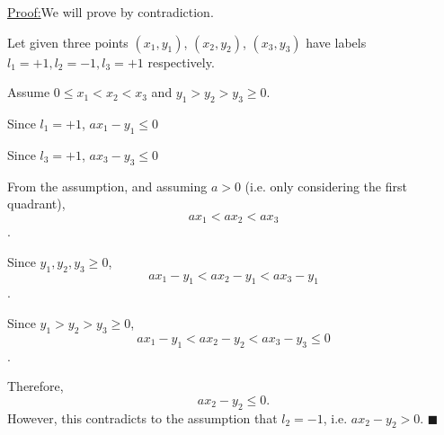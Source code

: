 \documentclass[11pt]{article}
\newenvironment{claimproof}[1]{\par\noindent\underline{Proof:}\space#1}{\hfill $\blacksquare$}
\begin{document}
\begin{claimproof}
We will prove by contradiction.

Let given three points $(x_1, y_1)$, $(x_2, y_2)$, $(x_3, y_3)$ have labels ${l_1 = +1, l_2 = -1, l_3 = +1}$ respectively.

Assume $0 \leq x_1 < x_2 < x_3$ and $y_1 > y_2 > y_3 \geq 0$.

Since $l_1 = +1$, $ax_1 - y_1 \leq 0$

Since $l_3 = +1$, $ax_3 - y_3 \leq 0$

From the assumption, and assuming $a > 0$ (i.e. only considering the first quadrant), $$ax_1 < ax_2 < ax_3$$. 

Since $y_1, y_2, y_3 \geq 0$, $$ax_1 - y_1 < ax_2 - y_1 < ax_3 - y_1$$.

Since $y_1 > y_2 > y_3 \geq 0$, $$ax_1 - y_1 < ax_2 - y_2 < ax_3 - y_3 \leq 0$$.

Therefore,$$ax_2 - y_2 \leq 0.$$
However, this contradicts to the assumption that $l_2 = -1$, i.e. $ax_2 - y_2 > 0$.
\end{claimproof}
\end{document}
